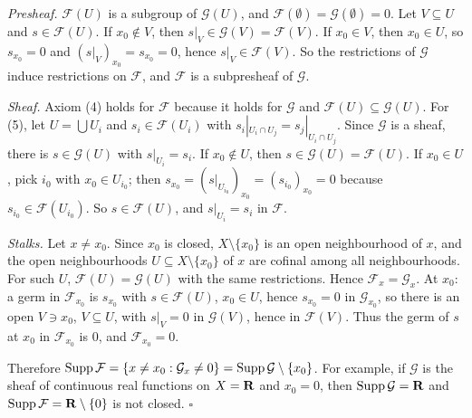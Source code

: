\documentclass[11pt]{article}
\begin{document}
\pf
\emph{Presheaf.} $\mathcal F(U)$ is a subgroup of $\mathcal G(U)$, and $\mathcal F(\emptyset)=\mathcal G(\emptyset)=0$. Let $V\subseteq U$ and $s\in\mathcal F(U)$. If $x_0\notin V$, then $s|_V\in\mathcal G(V)=\mathcal F(V)$. If $x_0\in V$, then $x_0\in U$, so $s_{x_0}=0$ and $(s|_V)_{x_0}=s_{x_0}=0$, hence $s|_V\in\mathcal F(V)$. So the restrictions of $\mathcal G$ induce restrictions on $\mathcal F$, and $\mathcal F$ is a subpresheaf of $\mathcal G$.

\emph{Sheaf.} Axiom (4) holds for $\mathcal F$ because it holds for $\mathcal G$ and $\mathcal F(U)\subseteq\mathcal G(U)$. For (5), let $U=\bigcup U_i$ and $s_i\in\mathcal F(U_i)$ with $s_i|_{U_i\cap U_j}=s_j|_{U_i\cap U_j}$. Since $\mathcal G$ is a sheaf, there is $s\in\mathcal G(U)$ with $s|_{U_i}=s_i$. If $x_0\notin U$, then $s\in\mathcal G(U)=\mathcal F(U)$. If $x_0\in U$, pick $i_0$ with $x_0\in U_{i_0}$; then $s_{x_0}=(s|_{U_{i_0}})_{x_0}=(s_{i_0})_{x_0}=0$ because $s_{i_0}\in\mathcal F(U_{i_0})$. So $s\in\mathcal F(U)$, and $s|_{U_i}=s_i$ in $\mathcal F$.

\emph{Stalks.} Let $x\neq x_0$. Since $x_0$ is closed, $X\setminus\{x_0\}$ is an open neighbourhood of $x$, and the open neighbourhoods $U\subseteq X\setminus\{x_0\}$ of $x$ are cofinal among all neighbourhoods. For such $U$, $\mathcal F(U)=\mathcal G(U)$ with the same restrictions. Hence $\mathcal F_x=\mathcal G_x$. At $x_0$: a germ in $\mathcal F_{x_0}$ is $s_{x_0}$ with $s\in\mathcal F(U)$, $x_0\in U$, hence $s_{x_0}=0$ in $\mathcal G_{x_0}$, so there is an open $V\ni x_0$, $V\subseteq U$, with $s|_V=0$ in $\mathcal G(V)$, hence in $\mathcal F(V)$. Thus the germ of $s$ at $x_0$ in $\mathcal F_{x_0}$ is $0$, and $\mathcal F_{x_0}=0$.

Therefore $\operatorname{Supp}\mathcal F=\{x\neq x_0:\mathcal G_x\neq0\}=\operatorname{Supp}\mathcal G\setminus\{x_0\}$. For example, if $\mathcal G$ is the sheaf of continuous real functions on $X=\mathbf R$ and $x_0=0$, then $\operatorname{Supp}\mathcal G=\mathbf R$ and $\operatorname{Supp}\mathcal F=\mathbf R\setminus\{0\}$ is not closed. \hfill$\square$
\end{document}
